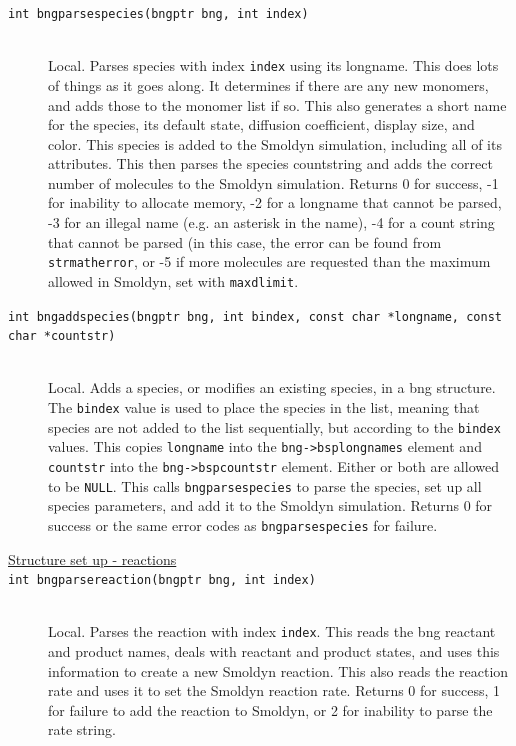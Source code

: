 \documentclass {scrbook}
\newcommand {\ttt} {\texttt}
\begin{document}
\begin{description}
\item[\ttt{int bngparsespecies(bngptr bng, int index)}]
\hfill \\
Local. Parses species with index \ttt{index} using its longname. This does lots of things as it goes along. It determines if there are any new monomers, and adds those to the monomer list if so. This also generates a short name for the species, its default state, diffusion coefficient, display size, and color. This species is added to the Smoldyn simulation, including all of its attributes. This then parses the species countstring and adds the correct number of molecules to the Smoldyn simulation. Returns 0 for success, -1 for inability to allocate memory, -2 for a longname that cannot be parsed, -3 for an illegal name (e.g. an asterisk in the name), -4 for a count string that cannot be parsed (in this case, the error can be found from \ttt{strmatherror}, or -5 if more molecules are requested than the maximum allowed in Smoldyn, set with \ttt{maxdlimit}.

\item[\ttt{int bngaddspecies(bngptr bng, int bindex, const char *longname, const char *countstr)}]
\hfill \\
Local. Adds a species, or modifies an existing species, in a bng structure. The \ttt{bindex} value is used to place the species in the list, meaning that species are not added to the list sequentially, but according to the \ttt{bindex} values. This copies \ttt{longname} into the \ttt{bng->bsplongnames} element and \ttt{countstr} into the \ttt{bng->bspcountstr} element. Either or both are allowed to be \ttt{NULL}. This calls \ttt{bngparsespecies} to parse the species, set up all species parameters, and add it to the Smoldyn simulation. Returns 0 for success or the same error codes as \ttt{bngparsespecies} for failure.

\item[\underline{Structure set up - reactions}]

\item[\ttt{int bngparsereaction(bngptr bng, int index)}]
\hfill \\
Local. Parses the reaction with index \ttt{index}. This reads the bng reactant and product names, deals with reactant and product states, and uses this information to create a new Smoldyn reaction. This also reads the reaction rate and uses it to set the Smoldyn reaction rate. Returns 0 for success, 1 for failure to add the reaction to Smoldyn, or 2 for inability to parse the rate string.


\end{description}
\end{document}
